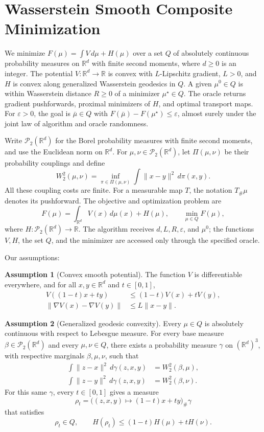 \documentclass[10pt]{article}
\theoremstyle{definition}
\newtheorem{assumption}{Assumption}
\begin{document}
\section*{Wasserstein Smooth Composite Minimization}
We minimize $F(\mu)=\int V\,d\mu+H(\mu)$ over a set $Q$ of absolutely continuous probability measures on $\mathbb{R}^d$ with finite second moments, where $d\geq0$ is an integer. The potential $V:\mathbb{R}^d\to\mathbb{R}$ is convex with $L$-Lipschitz gradient, $L>0$, and $H$ is convex along generalized Wasserstein geodesics in $Q$. A given $\mu^0\in Q$ is within Wasserstein distance $R\geq0$ of a minimizer $\mu^\star\in Q$. The oracle returns gradient pushforwards, proximal minimizers of $H$, and optimal transport maps. For $\varepsilon>0$, the goal is $\bar\mu\in Q$ with $F(\bar\mu)-F(\mu^\star)\leq\varepsilon$, almost surely under the joint law of algorithm and oracle randomness.

Write $\mathcal{P}_2(\mathbb{R}^d)$ for the Borel probability measures with finite second moments, and use the Euclidean norm on $\mathbb{R}^d$. For $\mu,\nu\in\mathcal{P}_2(\mathbb{R}^d)$, let $\Pi(\mu,\nu)$ be their probability couplings and define
\[
W_2^2(\mu,\nu)
=\inf_{\pi\in\Pi(\mu,\nu)}
\int \|x-y\|^2\,d\pi(x,y).
\]
All these coupling costs are finite. For a measurable map $T$, the notation $T_\#\mu$ denotes its pushforward. The objective and optimization problem are
\[
F(\mu)=\int_{\mathbb{R}^d}V(x)\,d\mu(x)+H(\mu),
\qquad
\min_{\mu\in Q}F(\mu),
\]
where $H:\mathcal{P}_2(\mathbb{R}^d)\to\mathbb{R}$. The algorithm receives $d,L,R,\varepsilon$, and $\mu^0$; the functions $V,H$, the set $Q$, and the minimizer are accessed only through the specified oracle.

Our assumptions:
\begin{assumption}[Convex smooth potential]
The function $V$ is differentiable everywhere, and for all $x,y\in\mathbb{R}^d$ and $t\in[0,1]$,
\[
\begin{aligned}
V((1-t)x+ty)&\leq(1-t)V(x)+tV(y),\\
\|\nabla V(x)-\nabla V(y)\|&\leq L\|x-y\|.
\end{aligned}
\]
\end{assumption}

\begin{assumption}[Generalized geodesic convexity]
Every $\mu\in Q$ is absolutely continuous with respect to Lebesgue measure. For every base measure $\beta\in\mathcal{P}_2(\mathbb{R}^d)$ and every $\mu,\nu\in Q$, there exists a probability measure $\gamma$ on $(\mathbb{R}^d)^3$, with respective marginals $\beta,\mu,\nu$, such that
\[
\begin{aligned}
\int\|z-x\|^2\,d\gamma(z,x,y)&=W_2^2(\beta,\mu),\\
\int\|z-y\|^2\,d\gamma(z,x,y)&=W_2^2(\beta,\nu).
\end{aligned}
\]
For this same $\gamma$, every $t\in[0,1]$ gives a measure
\[
\rho_t=\bigl((z,x,y)\mapsto(1-t)x+ty\bigr)_\#\gamma
\]
that satisfies
\[
\rho_t\in Q,
\qquad
H(\rho_t)\leq(1-t)H(\mu)+tH(\nu).
\]
\end{assumption}
\end{document}
